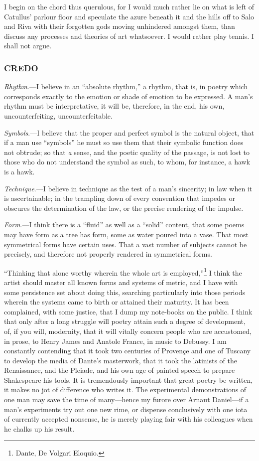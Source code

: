 I begin on the chord thus querulous, for I would much rather lie on what
is left of Catullus' parlour floor and speculate the azure beneath it
and the hills off to Salo and Riva with their forgotten gods moving
unhindered amongst them, than discuss any processes and theories of art
whatsoever. I would rather play tennis. I shall not argue.

\subsubsection{CREDO}\label{credo}

\emph{Rhythm}.---I believe in an ``absolute rhythm,'' a rhythm, that is,
in poetry which corresponds exactly to the emotion or shade of emotion
to be expressed. A man's rhythm must be interpretative, it will be,
therefore, in the end, his own, uncounterfeiting, uncounterfeitable.

\emph{Symbols}.---I believe that the proper and perfect symbol is the
natural object, that if a man use ``symbols'' he must so use them that
their symbolic function does not obtrude; so that \emph{a} sense, and
the poetic quality of the passage, is not lost to those who do not
understand the symbol as such, to whom, for instance, a hawk is a hawk.

\emph{Technique}.---I believe in technique as the test of a man's
sincerity; in law when it is ascertainable; in the trampling down of
every convention that impedes or obscures the determination of the law,
or the precise rendering of the impulse.

\emph{Form}.---I think there is a ``fluid'' as well as a ``solid''
content, that some poems may have form as a tree has form, some as water
poured into a vase. That most symmetrical forms have certain uses. That
a vast number of subjects cannot be precisely, and therefore not
properly rendered in symmetrical forms.

``Thinking that alone worthy wherein the whole art is
employed,''\footnote{Dante, De Volgari Eloquio.} I think the artist
should master all known forms and systems of metric, and I have with
some persistence set about doing this, searching particularly into those
periods wherein the systems came to birth or attained their maturity. It
has been complained, with some justice, that I dump my note-books on the
public. I think that only after a long struggle will poetry attain such
a degree of development, of, if you will, modernity, that it will
vitally concern people who are accustomed, in prose, to Henry James and
Anatole France, in music to Debussy. I am constantly contending that it
took two centuries of Provençe and one of Tuscany to develop the media
of Dante's masterwork, that it took the latinists of the Renaissance,
and the Pleiade, and his own age of painted speech to prepare
Shakespeare his tools. It is tremendously important that great poetry be
written, it makes no jot of difference who writes it. The experimental
demonstrations of one man may save the time of many---hence my furore
over Arnaut Daniel---if a man's experiments try out one new rime, or
dispense conclusively with one iota of currently accepted nonsense, he
is merely playing fair with his colleagues when he chalks up his result.

